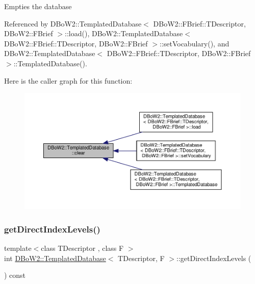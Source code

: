 Empties the database 

Referenced by D\+Bo\+W2\+::\+Templated\+Database$<$ D\+Bo\+W2\+::\+F\+Brief\+::\+T\+Descriptor, D\+Bo\+W2\+::\+F\+Brief $>$\+::load(), D\+Bo\+W2\+::\+Templated\+Database$<$ D\+Bo\+W2\+::\+F\+Brief\+::\+T\+Descriptor, D\+Bo\+W2\+::\+F\+Brief $>$\+::set\+Vocabulary(), and D\+Bo\+W2\+::\+Templated\+Database$<$ D\+Bo\+W2\+::\+F\+Brief\+::\+T\+Descriptor, D\+Bo\+W2\+::\+F\+Brief $>$\+::\+Templated\+Database().

Here is the caller graph for this function\+:\nopagebreak
\begin{figure}[H]
\begin{center}
\leavevmode
\includegraphics[width=350pt]{classDBoW2_1_1TemplatedDatabase_a88fe9b880f9b753de1ea6e07fe42808b_icgraph}
\end{center}
\end{figure}
\mbox{\label{classDBoW2_1_1TemplatedDatabase_af1fd1540b9e81fae498d41b87050efb0}} 
\subsubsection{\texorpdfstring{get\+Direct\+Index\+Levels()}{getDirectIndexLevels()}}
{\footnotesize\ttfamily template$<$class T\+Descriptor , class F $>$ \\
int \hyperlink{classDBoW2_1_1TemplatedDatabase}{D\+Bo\+W2\+::\+Templated\+Database}$<$ T\+Descriptor, F $>$\+::get\+Direct\+Index\+Levels (\begin{DoxyParamCaption}{ }\end{DoxyParamCaption}) const\hspace{0.3cm}{\ttfamily [inline]}}

